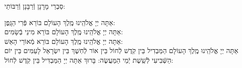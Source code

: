 \documentclass[twoside, openany, parskip=half, 11pt]{book}
\begin{document}
%
%

\nextpage


\begin{scriptsize}
סַבְרֵי מָרָנָן וְֿרַבָּנָן וְֿרַבּוֹתַי: \\
\end{scriptsize}
אַתָּה יְיָ אֱלֹהֵֽינוּ מֶֽלֶךְ הָעוֹלָם בּוֹרֵא פְּֿרִי הַגָּֽפֶן: \\
אַתָּה יְיָ אֱלֹהֵֽינוּ מֶֽלֶךְ הָעוֹלָם
בּוֹרֵא מִינֵי בְֿשָׂמִים: \\
אַתָּה יְיָ אֱלֹהֵֽינוּ מֶֽלֶךְ הָעוֹלָם בּוֹרֵא מְֿאוֹרֵי הָאֵשׁ:\\
אַתָּה יְיָ אֱלֹהֵֽינוּ מֶֽלֶךְ הָעוֹלָם הַמַּבְדִיל בֵּין קֹֽדֶשׁ לְֿחוֹל בֵּין אוֹר לְֿחֽשֶׁךְ בֵּין יִשְׂרָאֵל לָעַמִּים בֵּין יוֹם הַשְּֿׁבִיעִי לְֿשֵֽׁשֶׁת יְֿמֵי הַמַּעֲשֶׂה: בָּרוּךְ אַתָּה יְיָ הַמַּבְדִּיל בֵּין קֹֽדֶשׁ לְֿחוֹל:
\end{document}
